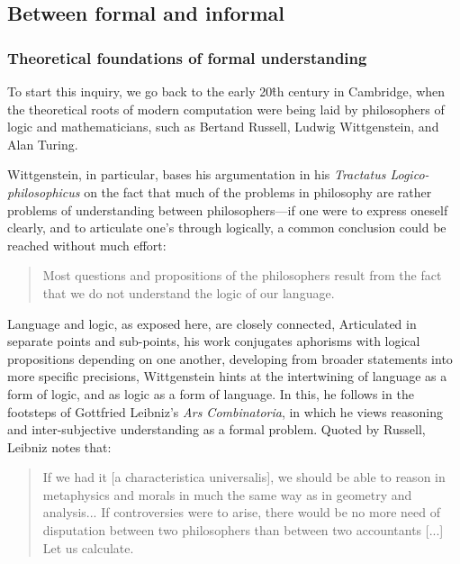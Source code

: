 \subsection{Between formal and informal} %

\subsubsection{Theoretical foundations of formal understanding}

To start this inquiry, we go back to the early 20\^{th} century in Cambridge, when the theoretical roots of modern computation were being laid by philosophers of logic and mathematicians, such as Bertand Russell, Ludwig Wittgenstein, and Alan Turing.

Wittgenstein, in particular, bases his argumentation in his \emph{Tractatus Logico-philosophicus} on the fact that much of the problems in philosophy are rather problems of understanding between philosophers—if one were to express oneself clearly, and to articulate one's through logically, a common conclusion could be reached without much effort:

\begin{quote}
    Most questions and propositions of the philosophers result from the fact that we do not understand the logic of our language. \cite{wittgenstein_tractatus_2010}
\end{quote}

Language and logic, as exposed here, are closely connected, Articulated in separate points and sub-points, his work conjugates aphorisms with logical propositions depending on one another, developing from broader statements into more specific precisions, Wittgenstein hints at the intertwining of language as a form of logic, and as logic as a form of language. In this, he follows in the footsteps of Gottfried Leibniz's \emph{Ars Combinatoria}, in which he views reasoning and inter-subjective understanding as a formal problem. Quoted by Russell, Leibniz notes that:

\begin{quote}
    If we had it [a characteristica universalis], we should be able to reason in metaphysics and morals in much the same way as in geometry and analysis... If controversies were to arise, there would be no more need of disputation between two philosophers than between two accountants [...] Let us calculate.\cite{russell_logical_1950}
\end{quote}

